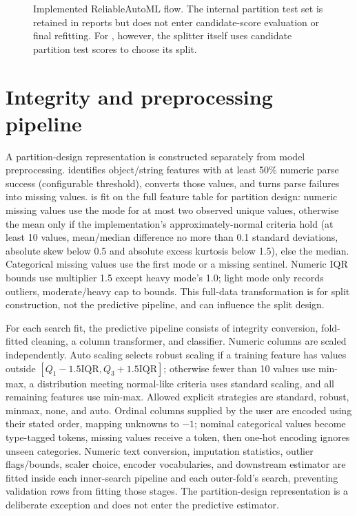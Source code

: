 ﻿\documentclass[conference]{IEEEtran}
\begin{document}
\begin{figure}[t]
\centering
{}
\caption{Implemented ReliableAutoML flow. The internal partition test set is retained in reports but does not enter candidate-score evaluation or final refitting. For , however, the splitter itself uses candidate partition test scores to choose its split.}
\label{fig:flow}
\end{figure}

\section{Integrity and preprocessing pipeline}
A partition-design representation is constructed separately from model preprocessing.  identifies object/string features with at least 50\% numeric parse success (configurable threshold), converts those values, and turns parse failures into missing values.  is fit on the full feature table for partition design: numeric missing values use the mode for at most two observed unique values, otherwise the mean only if the implementation's approximately-normal criteria hold (at least 10 values, mean/median difference no more than 0.1 standard deviations, absolute skew below 0.5 and absolute excess kurtosis below 1.5), else the median. Categorical missing values use the first mode or a missing sentinel. Numeric IQR bounds use multiplier 1.5 except heavy mode's 1.0; light mode only records outliers, moderate/heavy cap to bounds. This full-data transformation is for split construction, not the predictive pipeline, and can influence the split design.

For each search fit, the predictive pipeline consists of integrity conversion, fold-fitted cleaning, a column transformer, and classifier. Numeric columns are scaled independently. Auto scaling selects robust scaling if a training feature has values outside \([Q_1-1.5\mathrm{IQR},Q_3+1.5\mathrm{IQR}]\); otherwise fewer than 10 values use min-max, a distribution meeting normal-like criteria uses standard scaling, and all remaining features use min-max. Allowed explicit strategies are standard, robust, minmax, none, and auto. Ordinal columns supplied by the user are encoded using their stated order, mapping unknowns to \(-1\); nominal categorical values become type-tagged tokens, missing values receive a token, then one-hot encoding ignores unseen categories. Numeric text conversion, imputation statistics, outlier flags/bounds, scaler choice, encoder vocabularies, and downstream estimator are fitted inside each inner-search pipeline and each outer-fold's search, preventing validation rows from fitting those stages. The partition-design representation is a deliberate exception and does not enter the predictive estimator.
\end{document}
